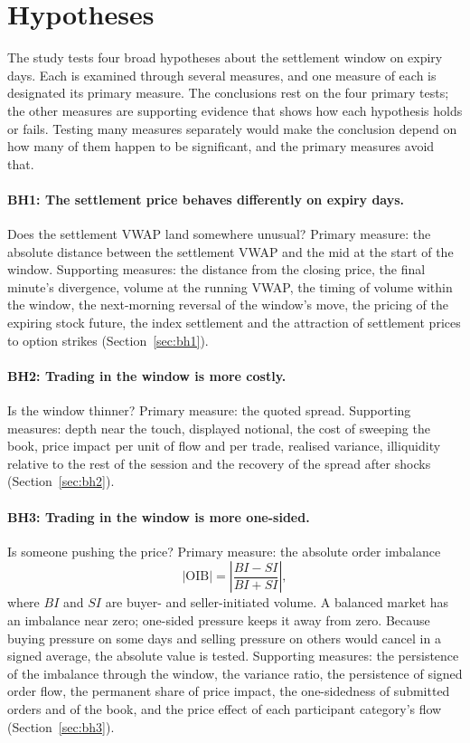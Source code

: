\section{Hypotheses}\label{sec:hypotheses}

The study tests four broad hypotheses about the settlement window on expiry days. Each is
examined through several measures, and one measure of each is designated its primary measure.
The conclusions rest on the four primary tests; the other measures are supporting evidence that
shows how each hypothesis holds or fails. Testing many measures separately would make the
conclusion depend on how many of them happen to be significant, and the primary measures avoid
that.

\paragraph{BH1: The settlement price behaves differently on expiry days.} Does the settlement
VWAP land somewhere unusual? Primary measure: the absolute distance between the settlement VWAP
and the mid at the start of the window. Supporting measures: the distance from the closing price, the final
minute's divergence, volume at the running VWAP, the timing of volume within the window, the
next-morning reversal of the window's move, the pricing of the expiring stock future, the index
settlement and the attraction of settlement prices to option strikes (Section~\ref{sec:bh1}).

\paragraph{BH2: Trading in the window is more costly.} Is the window thinner? Primary measure:
the quoted spread. Supporting measures: depth near the touch, displayed notional, the cost of
sweeping the book, price impact per unit of flow and per trade, realised variance, illiquidity
relative to the rest of the session and the recovery of the spread after shocks
(Section~\ref{sec:bh2}).

\paragraph{BH3: Trading in the window is more one-sided.} Is someone pushing the price? Primary
measure: the absolute order imbalance
\begin{equation*}
  |\mathrm{OIB}| = \left|\frac{BI - SI}{BI + SI}\right|,
\end{equation*}
where $BI$ and $SI$ are buyer- and seller-initiated volume. A balanced market has an imbalance
near zero; one-sided pressure keeps it away from zero. Because buying pressure on some days and
selling pressure on others would cancel in a signed average, the absolute value is tested.
Supporting measures: the persistence of the imbalance through the window, the variance ratio,
the persistence of signed order flow, the permanent share of price impact, the one-sidedness of
submitted orders and of the book, and the price effect of each participant category's flow
(Section~\ref{sec:bh3}).

